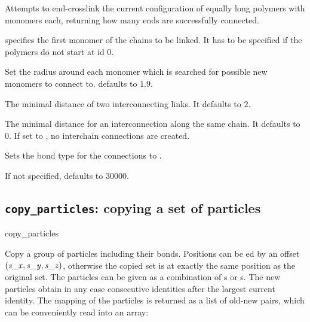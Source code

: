 Attempts to end-crosslink the current configuration of
 equally long polymers with
 monomers each, returning how many ends are
successfully connected.

\begin{arguments}
\item[\opt{start \var{pid}}]  specifies the first monomer of
  the chains to be linked. It has to be specified if the polymers do
  not start at id 0.
\item[\opt{catch \var{r_catch}}] Set the radius around each monomer
  which is searched for possible new monomers to connect to.
   defaults to $1.9$.
\item[\opt{distLink \var{link\_dist}}] The minimal distance of two
  interconnecting links. It defaults to $2$.
\item[\opt{distChain \var{chain\_dist}}] The minimal distance for an
  interconnection along the same chain. It defaults to $0$. If set to
  , no interchain connections are created.
\item[\opt{FENE \var{bondid}}] Sets the bond type for the connections
  to .
\item[\opt{trials \var{try_\mathrm{max}}}] If not specified,
   defaults to $30000$.
\end{arguments}

\subsection{\texttt{copy\_particles}: copying a set of particles}
\begin{essyntax}
  copy_particles
\end{essyntax}

Copy a group of particles including their bonds. Positions can be
ed by an offset $(\mathrm{\mathit{s\_x}}, \mathrm{\mathit{s\_y}}, \mathrm{\mathit{s\_z}})$,
otherwise the copied set is at exactly the same position as the
original set. The particles can be given as a combination of
s or s. The new particles obtain in any case
consecutive identities after the largest current identity. The mapping
of the particles is returned as a list of old-new pairs, which can be
conveniently read into an array:


